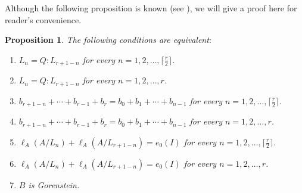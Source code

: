 \documentclass[12pt]{amsart}
\newtheorem{prop}[thm]{Proposition}
\theoremstyle{definition}
\theoremstyle{remark}
\numberwithin{equation}{section}
\renewcommand{\:}{\colon}
\begin{document}
\par \vspace{2mm}
 Although the following proposition is known (see \cite[Theorem 4.3]{HKU}), 
we will give a proof here for reader's convenience.


\begin{prop} \label{Mainpart}
The following conditions are equivalent$:$
\begin{enumerate}
\item $L_n=Q:L_{r+1-n}$ for every $n=1,2,\ldots, \lceil \frac{r}{2} \rceil$.  
\item[$(1)'$] $L_n=Q:L_{r+1-n}$ for every $n=1,2,\ldots, r$.
\item $b_{r+1-n}+\cdots +b_{r-1}+b_r=b_0+b_1+\cdots+b_{n-1}$ 
for every $n=1,2,\ldots, \lceil \frac{r}{2} \rceil$.  
\item[$(2)'$] $b_{r+1-n}+\cdots +b_{r-1}+b_r=b_0+b_1+\cdots+b_{n-1}$ 
for every $n=1,2,\ldots, r$. 
\item $\ell_A(A/L_n)+\ell_A(A/L_{r+1-n}) =e_0(I)$ 
 for every $n=1,2,\ldots, \lceil \frac{r}{2} \rceil$.  
\item[$(3)'$] $\ell_A(A/L_n)+\ell_A(A/L_{r+1-n}) =e_0(I)$ 
 for every $n=1,2,\ldots, r$. 
\item $B$ is Gorenstein. 
\end{enumerate}
\end{prop}
\end{document}
